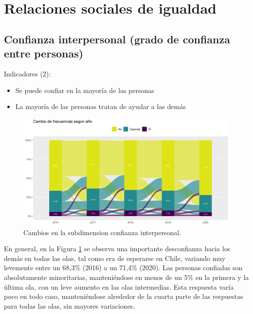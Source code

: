 \documentclass[
  12pt,
]{book}
\begin{document}
\hypertarget{relaciones-sociales-de-igualdad-1}{%
\section{Relaciones sociales de igualdad}\label{relaciones-sociales-de-igualdad-1}}

\hypertarget{confianza-interpersonal-grado-de-confianza-entre-personas}{%
\subsection{Confianza interpersonal (grado de confianza entre personas)}\label{confianza-interpersonal-grado-de-confianza-entre-personas}}

Indicadores (2):

\begin{itemize}
\item
  Se puede confiar en la mayoría de las personas
\item
  La mayoría de las personas tratan de ayudar a las demás
\end{itemize}

\begin{figure}[H]

{\centering \includegraphics[width=1\linewidth,height=1\textheight]{output/graphs/alluvial_conf_interpersonal} 

}

\caption{Cambios en la subdimension confianza interpersonal.}\label{fig:alluvial-conf-interpersonal}
\end{figure}

En general, en la Figura \ref{fig:alluvial-conf-interpersonal} se observa una importante desconfianza hacia los demás en todas las olas, tal como era de esperarse en Chile, variando muy levemente entre un 68,3\% (2016) a un 71,4\% (2020). Las personas confiadas son absolutamente minoritarias, manteniéndose en menos de un 5\% en la primera y la última ola, con un leve aumento en las olas intermedias. Esta respuesta varía poco en todo caso, manteniéndose alrededor de la cuarta parte de las respuestas para todas las olas, sin mayores variaciones.
\end{document}
